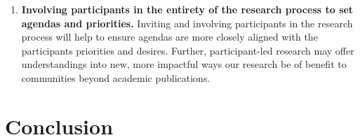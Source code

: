 \begin{enumerate}[resume]
    \item \textbf{Involving participants in the entirety of the research process to set agendas and priorities.} Inviting and involving participants in the research process will help to ensure agendas are more closely aligned with the participants priorities and desires. Further, participant-led research may offer understandings into new, more impactful ways our research be of benefit to communities beyond academic publications. 
\end{enumerate}

\section{Conclusion}
\label{sec:Conclusion}